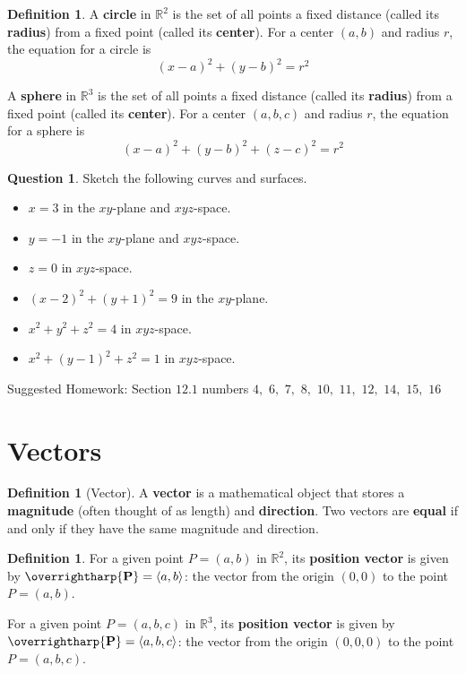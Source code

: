 \documentclass[letterpaper, twoside, 12pt]{book}
\newcommand{\<}{\langle}
\renewcommand{\>}{\rangle}
\theoremstyle{definition}
\theoremstyle{definition}
\newtheorem{definition}[theorem]{Definition}
\newtheorem{question}[theorem]{Question}
\newcommand{\harpvec}[1]{\overrightharp{\ensuremath{\mathbf{#1}}}}
\begin{document}
\begin{definition}
  A \textbf{circle} in $\mathbb{R}^2$ is the set of all points a fixed distance
  (called its \textbf{radius}) from a fixed point (called its \textbf{center}).
  For a center $(a,b)$ and radius $r$, the equation for a circle is
  \[
    (x-a)^2+(y-b)^2=r^2
  \]

  A \textbf{sphere} in $\mathbb{R}^3$ is the set of all points a fixed distance
  (called its \textbf{radius}) from a fixed point (called its \textbf{center}).
  For a center $(a,b,c)$ and radius $r$, the equation for a sphere is
  \[
    (x-a)^2+(y-b)^2+(z-c)^2=r^2
  \]
\end{definition}

\begin{question}
  Sketch the following curves and surfaces.
  \begin{itemize}
    \item $x=3$ in the $xy$-plane and $xyz$-space.
    \item $y=-1$ in the $xy$-plane and $xyz$-space.
    \item $z=0$ in $xyz$-space.
    \item $(x-2)^2+(y+1)^2=9$ in the $xy$-plane.
    \item $x^2+y^2+z^2=4$ in $xyz$-space.
    \item $x^2+(y-1)^2+z^2=1$ in $xyz$-space.
  \end{itemize}
\end{question}

\vfill

\noindent Suggested Homework:
Section $12.1$ numbers $4,$ $6,$ $7,$ $8,$ $10,$ $11,$ $12,$ $14,$ $15,$ $16$

\newpage

\section{Vectors}

\begin{definition}[Vector]
  A \textbf{vector} is a mathematical object that stores a \textbf{magnitude}
  (often thought of as length) and \textbf{direction}.
  Two vectors are \textbf{equal} if and only if they have the same magnitude and
  direction.
\end{definition}

\begin{definition}
  For a given point $P=(a,b)$ in $\mathbb{R}^2$, its \textbf{position vector}
  is given by $\harpvec{P}=\<a,b\>$: the vector from the origin $(0,0)$ to the
  point $P=(a,b)$.

  For a given point $P=(a,b,c)$ in $\mathbb{R}^3$, its \textbf{position vector}
  is given by $\harpvec{P}=\<a,b,c\>$: the vector from the origin $(0,0,0)$ to
  the point $P=(a,b,c)$.
\end{definition}
\end{document}
